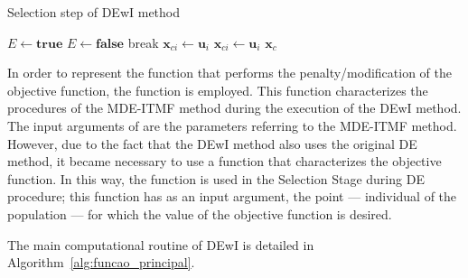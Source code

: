 \documentclass[smallextended]{svjour3}       %
\begin{document}
\begin{algorithm}[!h]
\caption{Selection step of DEwI method}
\label{alg:etapa_selecao_EDI}
\begin{algorithmic}[1]
		\State $ E \leftarrow \textbf{true} $
				\State $ E \leftarrow \textbf{false} $
				\State break
			\EndIf
		\EndFor
					\State $ \boldsymbol{x}_{ci} \leftarrow \boldsymbol{u}_{i} $
				\EndIf				
			\Else
						\State $ \boldsymbol{x}_{ci} \leftarrow \boldsymbol{u}_{i} $
					\EndIf
			\EndIf
		\EndIf
	\EndFor
	\State \Return $ \boldsymbol{x}_{c} $
\EndFunction
\end{algorithmic}
\end{algorithm}

In order to represent the function that performs the penalty/modification of the objective function, the function  is employed. This function characterizes the procedures of the MDE-ITMF method during the execution of the DEwI method. The input arguments of  are the parameters referring to the MDE-ITMF method. However, due to the fact that the DEwI method also uses the original DE method, it became necessary to use a function that characterizes the objective function. In this way, the  function is used in the Selection Stage during DE procedure; this function has as an input argument, the point --- individual of the population --- for which the value of the objective function is desired.

The main computational routine of DEwI is detailed in Algorithm~\ref{alg:funcao_principal}.
\end{document}

